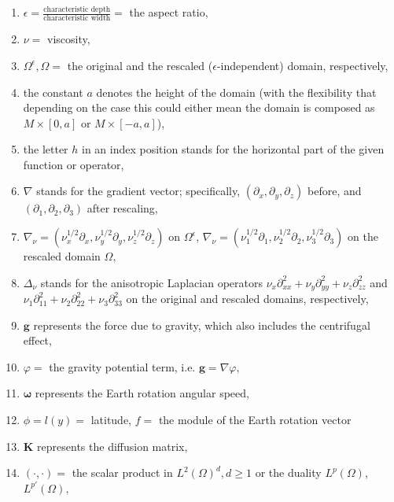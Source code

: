 \documentclass[12pt]{report}
\numberwithin{theorem}{chapter}
\numberwithin{corollary}{chapter}
\numberwithin{lemma}{chapter}
\numberwithin{remark}{chapter}
\numberwithin{definition}{chapter}
\numberwithin{prop}{chapter}
\begin{document}
\begin{enumerate}

\item $\epsilon = \frac{\text{characteristic depth}}{\text{characteristic width}} = $ the aspect ratio,
\item $\nu = $ viscosity,
\item $\Omega^\epsilon, \Omega = $ the original and the rescaled ($\epsilon$-independent) domain, respectively,
\item the constant $a$ denotes the height of the domain (with the flexibility that depending on the case this could either mean the domain is composed as $M \times [0,a]$ or $M \times [-a, a]$),
\item the letter $h$ in an index position stands for the horizontal part of the given function or operator,
\item $\nabla$ stands for the gradient vector; specifically, $(\partial_x, \partial_y, \partial_z)$ before, and $(\partial_1, \partial_2, \partial_3)$ after rescaling,
\item $\nabla_\nu = (\nu_x^{1/2} \partial_x, \nu_y^{1/2} \partial_y, \nu_z^{1/2} \partial_z)$ on $\Omega^\epsilon$, $\nabla_\nu = (\nu_1^{1/2} \partial_1, \nu_2^{1/2} \partial_2, \nu_3^{1/2} \partial_3)$ on the rescaled domain $\Omega,$
\item $ \Delta_\nu$ stands for the anisotropic Laplacian operators $\nu_x \partial^2_{xx} + \nu_y \partial^2_{yy}  + \nu_z \partial^2_{zz}$ and $\nu_1 \partial^2_{11} + \nu_2 \partial^2_{22}  + \nu_3 \partial^2_{33}$ on the original and rescaled domains, respectively,
\item $\mathbf{g}$ represents the force due to gravity, which also includes the centrifugal effect,
\item $\varphi = $ the gravity potential term, i.e. $\mathbf{g} = \nabla \varphi,$
\item $\mathbf{\omega}$ represents the Earth rotation angular speed,
\item $\phi = l(y) = $ latitude, $f = $ the module of the Earth rotation vector
\item $\mathbf{K}$ represents the diffusion matrix,
\item $( \cdot,\cdot) = $ the scalar product in $L^2(\Omega)^d, d \geq 1$ or the duality $L^p (\Omega)$, $L^{p'} (\Omega),$

\end{enumerate}
\end{document}
